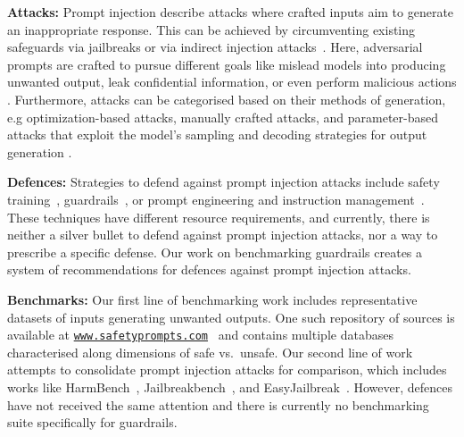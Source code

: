 \textbf{Attacks:} Prompt injection describe attacks where crafted inputs aim to generate an inappropriate response. This can be achieved by circumventing existing safeguards via jailbreaks \cite{zou2023universal,zhu2023autodan,chao2023jailbreaking,wei2024jailbroken} or via indirect injection attacks~\cite{abdelnabi2023not,liu2023prompt}.
Here, adversarial prompts are crafted to pursue different goals like mislead models into producing unwanted output, leak confidential information, or even perform malicious actions \cite{zhang2023prompts, kim2024propile, perez2022ignore}. Furthermore, attacks can be categorised based on their methods of generation, e.g optimization-based attacks, manually crafted attacks, and parameter-based attacks that exploit the model's sampling and decoding strategies for output generation \cite{zou2023universal, deng2023multilingual}.

\textbf{Defences:} Strategies to defend against prompt injection attacks include safety training~\cite{piet2023jatmo,openai2023gpt4}, guardrails~\cite{rebedea2023nemo,DBLP:journals/corr/abs-2312-06674}, or prompt engineering and instruction management~\cite{wallace2024instruction,xie2023defending,zhang2024parden}.
These techniques have different resource requirements, and currently, there is neither a silver bullet to defend against prompt injection attacks, nor a way to prescribe a specific defense.
Our work on benchmarking guardrails creates a system of recommendations for defences against prompt injection attacks.

\textbf{Benchmarks:} Our first line of benchmarking work includes representative datasets of inputs generating unwanted outputs. 
One such repository of sources is available at \href{https://safetyprompts.com/}{\texttt{www.safetyprompts.com}}~\cite{röttger2024safetyprompts} and contains multiple databases characterised along dimensions of safe vs.\ unsafe. Our second line of work attempts to consolidate prompt injection attacks for comparison, which includes works like HarmBench~\cite{mazeika2024harmbench}, Jailbreakbench~\cite{chao2024jailbreakbench}, and EasyJailbreak~\cite{zhou2024easyjailbreak}.
However, defences have not received the same attention and there is currently no benchmarking suite specifically for guardrails.